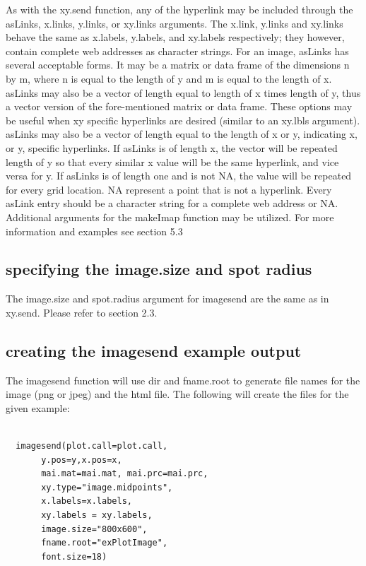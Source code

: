 \documentclass[]{article}
\begin{document}
\indent As with the xy.send function, any of the hyperlink may be included through the asLinks, x.links, y.links, or xy.links arguments. The x.link, y.links and xy.links behave the same as x.labels, y.labels, and xy.labels respectively; they however, contain complete web addresses as character strings. For an image, asLinks has several acceptable forms. It may be a matrix or data frame of the dimensions n by m, where n is equal to the length of y and m is equal to the length of x. asLinks may also be a vector of length equal to length of x times length of y, thus a vector version of the fore-mentioned matrix or data frame. These options may be useful when xy specific hyperlinks are desired (similar to an xy.lbls argument). asLinks may also be a vector of length equal to the length of x or y, indicating x, or y, specific hyperlinks. If asLinks is of length x, the vector will be repeated length of y so that every similar x value will be the same hyperlink, and vice versa for y. If asLinks is of length one and is not NA, the value will be repeated for every grid location. NA represent a point that is not a hyperlink.  Every asLink entry should be a character string for a complete web address or NA. Additional arguments for the makeImap function may be utilized. For more information and examples see section 5.3

\subsection{specifying the image.size and spot radius}

\indent The image.size and spot.radius argument for imagesend are the same as in xy.send. Please refer to section 2.3. 


\subsection{creating the imagesend example output}


\indent The imagesend function will use dir and fname.root to generate file names for the image (png or jpeg) and the html file. The following will create the files for the given example:


\begin{verbatim}

  imagesend(plot.call=plot.call,
       y.pos=y,x.pos=x,
       mai.mat=mai.mat, mai.prc=mai.prc,
       xy.type="image.midpoints",
       x.labels=x.labels,
       xy.labels = xy.labels, 
       image.size="800x600",
       fname.root="exPlotImage", 
       font.size=18)

\end{verbatim}
\end{document}
